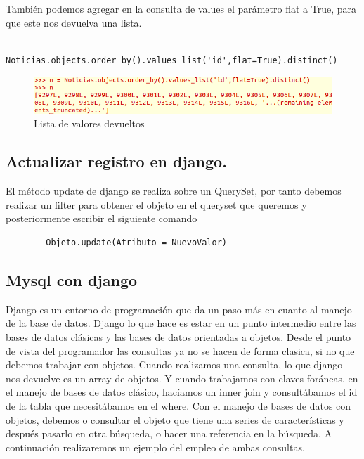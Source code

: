 \begin{description}
\begin{description}
	  También podemos agregar en la consulta de values el parámetro flat a True, para que este nos devuelva una lista.
	  \begin{lstlisting}
	 	Noticias.objects.order_by().values_list('id',flat=True).distinct()  
	  \end{lstlisting}
	\begin{figure}[h]
		\includegraphics[width=\textwidth]{./django/imagenes/distinct_list.png}
	\caption{Lista de valores devueltos}
	\end{figure}	   

	\end{description}

\end{description}

\subsection{Actualizar registro en django.}

El método update de django se realiza sobre un QuerySet, por tanto debemos realizar un filter para obtener el objeto en el queryset que queremos y posteriormente escribir el siguiente comando

	  \begin{lstlisting}
		Objeto.update(Atributo = NuevoValor)
	  \end{lstlisting}



\subsection{Mysql con django}

	Django es un entorno de programación que da un paso más en cuanto al manejo de la base de datos. Django lo que hace es estar en un punto intermedio entre las bases de datos clásicas y las bases de datos orientadas a objetos. Desde el punto de vista del programador las consultas ya no se hacen de forma clasica, si no que debemos trabajar con objetos.
	Cuando realizamos una consulta, lo que django nos devuelve es un array de objetos. Y cuando trabajamos con claves foráneas, en el manejo de bases de datos clásico, hacíamos un inner join y consultábamos el id de la tabla que necesitábamos en el where. Con el manejo de bases de datos con objetos, debemos o consultar el objeto que tiene una series de características y después pasarlo en otra búsqueda, o hacer una referencia en la búsqueda. A continuación realizaremos un ejemplo del empleo de ambas consultas.
	
